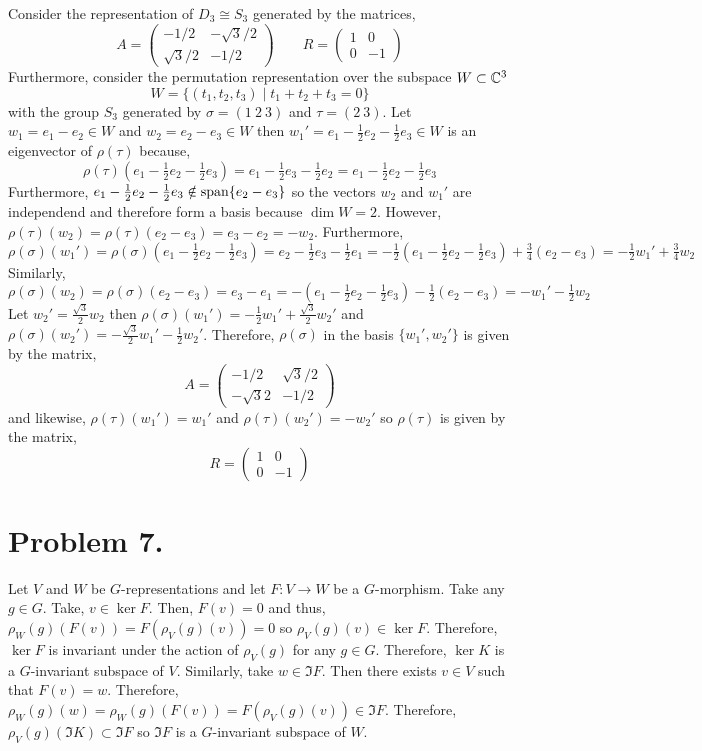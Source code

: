 \documentclass[12pt]{extarticle}
\begin{document}
Consider the representation of $D_3 \cong S_3$ generated by the matrices,
\[ A = 
\begin{pmatrix}
-1/2 & - \sqrt{3}/2 \\
\sqrt{3}/2 & -1/2
\end{pmatrix}
\quad \quad 
R = 
\begin{pmatrix}
1 & 0 \\
0 & -1
\end{pmatrix}\]
Furthermore, consider the permutation representation over the subspace $W \subset \mathbb{C}^3$
\[ W = \{(t_1, t_2, t_3) \mid t_1 + t_2 + t_3 = 0 \} \]
with the group $S_3$ generated by $\sigma = (1 \: 2 \: 3)$ and $\tau = (2 \: 3)$. Let $w_1 = e_1 - e_2 \in W$ and $w_2 = e_2 - e_3 \in W$ then $w_1' = e_1 - \tfrac{1}{2}e_2 - \tfrac{1}{2} e_3 \in W$ is an eigenvector of $\rho(\tau)$ because, 
\[\rho(\tau)( e_1 - \tfrac{1}{2}e_2 - \tfrac{1}{2} e_3 ) = e_1 - \tfrac{1}{2}e_3 - \tfrac{1}{2} e_2 = e_1 - \tfrac{1}{2}e_2 - \tfrac{1}{2} e_3\]
Furthermore, $e_1 - \tfrac{1}{2}e_2 - \tfrac{1}{2} e_3 \notin \mathrm{span}\! \left\{e_2 - e_3 \right\}$ so the vectors $w_2$ and $w_1'$ are independend and therefore form a basis because $\dim{W} = 2$. However, $\rho(\tau)(w_2) = \rho(\tau)(e_2 - e_3) = e_3 - e_2 = - w_2$. Furthermore, 
\[\rho(\sigma) (w_1') = \rho(\sigma)(e_1 - \tfrac{1}{2}e_2 - \tfrac{1}{2} e_3) = e_2 - \tfrac{1}{2}e_3 - \tfrac{1}{2} e_1 = - \tfrac{1}{2} (e_1 - \tfrac{1}{2} e_2 - \tfrac{1}{2} e_3) + \tfrac{3}{4} (e_2 - e_3) = - \tfrac{1}{2} w_1' + \tfrac{3}{4} w_2 \]    
Similarly,
\[\rho(\sigma) (w_2) = \rho(\sigma)(e_2 - e_3) = e_3 - e_1 = - (e_1 - \tfrac{1}{2} e_2 - \tfrac{1}{2} e_3) - \tfrac{1}{2} (e_2 - e_3) = - w_1' - \tfrac{1}{2} w_2 \]
Let $w_2' = \frac{\sqrt{3}}{2} w_2$ then $\rho(\sigma)(w_1') = -\tfrac{1}{2} w_1' + \frac{\sqrt{3}}{2} w_2'$ and $\rho(\sigma)(w_2') = - \frac{\sqrt{3}}{2} w_1' - \tfrac{1}{2} w_2'$. Therefore, $\rho(\sigma)$ in the basis $\{w_1', w_2'\}$ is given by the matrix,
\[
A = 
\begin{pmatrix}
- 1/2 & \sqrt{3}/2 \\
-\sqrt{3}{2} & - 1/2
\end{pmatrix}\]
and likewise, $\rho(\tau)(w_1') = w_1'$ and $\rho(\tau)(w_2') = - w_2'$ so $\rho(\tau)$ is given by the matrix,
\[
R = 
\begin{pmatrix}
1 & 0 \\
0 & - 1
\end{pmatrix}\]
\section*{Problem 7.}

Let $V$ and $W$ be $G$-representations and let $F : V \to W$ be a $G$-morphism. Take any $g \in G$. Take, $v \in \ker{F}$. Then, $F(v) = 0$ and thus, $\rho_W(g)(F(v)) = F(\rho_V(g)(v)) = 0$ so $\rho_V(g)(v) \in \ker{F}$. Therefore, $\ker{F}$ is invariant under the action of $\rho_V(g)$ for any $g \in G$. Therefore, $\ker{K}$ is a $G$-invariant subspace of $V$. Similarly, take $w \in \Im{F}$. Then there exists $v \in V$ such that $F(v) = w$. Therefore, $\rho_W(g)(w) = \rho_W(g)(F(v)) = F(\rho_V(g)(v)) \in \Im{F}$. Therefore, $\rho_V(g)(\Im{K}) \subset \Im{F}$ so $\Im{F}$ is a $G$-invariant subspace of $W$. 
\end{document}
